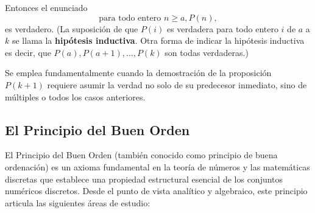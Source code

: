 \documentclass{article}
\begin{document}
Entonces el enunciado
\begin{equation*}
    \text{para todo entero } n \geq a, P(n),
\end{equation*}
es verdadero. (La suposición de que $P(i)$ es verdadera para todo entero $i$ de $a$ a $k$ se llama la \textbf{hipótesis inductiva}. Otra forma de indicar la hipótesis inductiva es decir, que $P(a), P(a + 1), \dots, P(k)$ son todas verdaderas.)
\bigskip

Se emplea fundamentalmente cuando la demostración de la proposición $P(k + 1)$ requiere asumir la verdad no solo de su predecesor inmediato, sino de múltiples o todos los casos anteriores.

\subsection{El Principio del Buen Orden}
\label{sec:principio-buen-orden}

El Principio del Buen Orden (también conocido como principio de buena ordenación) es un axioma fundamental en la teoría de números y las matemáticas discretas que establece una propiedad estructural esencial de los conjuntos numéricos discretos. Desde el punto de vista analítico y algebraico, este principio articula las siguientes áreas de estudio:
\end{document}
